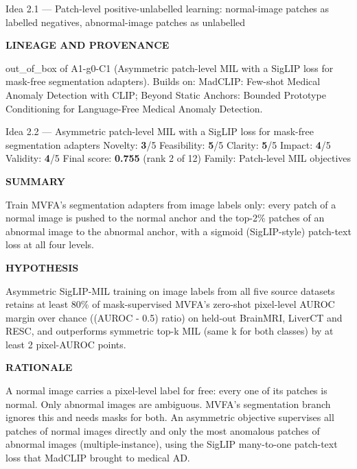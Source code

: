 \documentclass[11pt,a4paper]{article}
\newcommand{\lbl}[1]{{\sffamily\footnotesize\bfseries\color{muted}\MakeUppercase{#1}}\par}
\begin{document}
\begin{ideabox}{Idea 2.1 — Patch-level positive-unlabelled learning: normal-image patches as labelled negatives, abnormal-image patches as unlabelled}
\begin{itemize}[leftmargin=1.2em,itemsep=1pt,topsep=2pt]
\end{itemize}
\lbl{Lineage and provenance}{\small out\_\allowbreak{}of\_\allowbreak{}box of A1-g0-C1 (Asymmetric patch-level MIL with a SigLIP loss for mask-free segmentation adapters). Builds on: MadCLIP: Few-shot Medical Anomaly Detection with CLIP; Beyond Static Anchors: Bounded Prototype Conditioning for Language-Free Medical Anomaly Detection.}
\end{ideabox}
\begin{ideabox}{Idea 2.2 — Asymmetric patch-level MIL with a SigLIP loss for mask-free segmentation adapters}
{\small Novelty: \textbf{3}/5 \quad Feasibility: \textbf{5}/5 \quad Clarity: \textbf{5}/5 \quad Impact: \textbf{4}/5 \quad Validity: \textbf{4}/5 \quad Final score: \textbf{0.755} (rank 2 of 12) \quad Family: Patch-level MIL objectives}\par\smallskip
\lbl{Summary}Train MVFA's segmentation adapters from image labels only: every patch of a normal image is pushed to the normal anchor and the top-2\% patches of an abnormal image to the abnormal anchor, with a sigmoid (SigLIP-style) patch-text loss at all four levels.

\lbl{Hypothesis}Asymmetric SigLIP-MIL training on image labels from all five source datasets retains at least 80\% of mask-supervised MVFA's zero-shot pixel-level AUROC margin over chance ((AUROC - 0.5) ratio) on held-out BrainMRI, LiverCT and RESC, and outperforms symmetric top-k MIL (same k for both classes) by at least 2 pixel-AUROC points.

\lbl{Rationale}A normal image carries a pixel-level label for free: every one of its patches is normal. Only abnormal images are ambiguous. MVFA's segmentation branch ignores this and needs masks for both. An asymmetric objective supervises all patches of normal images directly and only the most anomalous patches of abnormal images (multiple-instance), using the SigLIP many-to-one patch-text loss that MadCLIP brought to medical AD.


\end{ideabox}
\end{document}
